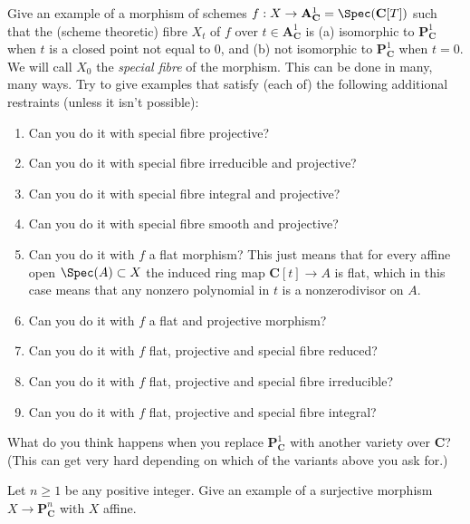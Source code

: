 \begin{exercise}
\label{exercise-family-special-fibre-different}
Give an example of a morphism of schemes
$f : X \to {\mathbf A}^1_{\mathbf C} = \Spec({\mathbf C}[T])$
such that the (scheme theoretic) fibre $X_t$ of $f$ over
$t \in {\mathbf A}^1_{\mathbf C}$ is
(a) isomorphic to ${\mathbf P}^1_{\mathbf C}$ when $t$
is a closed point not equal to $0$, and
(b) not isomorphic to ${\mathbf P}^1_{\mathbf C}$ when $t = 0$.
We will call $X_0$ the {\it special fibre} of the morphism.
This can be done in many, many ways. Try to give examples that
satisfy (each of) the following additional restraints (unless
it isn't possible):
\begin{enumerate}
\item Can you do it with special fibre projective?
\item Can you do it with special fibre irreducible and projective?
\item Can you do it with special fibre integral and projective?
\item Can you do it with special fibre smooth and projective?
\item Can you do it with $f$ a flat morphism?
This just means that for every affine open $\Spec(A) \subset X$ the
induced ring map $\mathbf{C}[t] \to A$ is flat, which in this case means
that any nonzero polynomial in $t$ is a nonzerodivisor on $A$.
\item Can you do it with $f$ a flat and projective morphism?
\item Can you do it with $f$ flat, projective and special fibre reduced?
\item Can you do it with $f$ flat, projective and special fibre irreducible?
\item Can you do it with $f$ flat, projective and special fibre integral?
\end{enumerate}
What do you think happens when you replace
${\mathbf P}^1_{\mathbf C}$ with another variety over ${\mathbf C}$?
(This can get very hard depending on which of the variants above you
ask for.)
\end{exercise}

\begin{exercise}
\label{exercise-affine-onto-projective-space}
Let $n \geq 1$ be any positive integer.
Give an example of a surjective morphism
$X \to {\mathbf P}^n_{\mathbf C}$ with $X$ affine.
\end{exercise}

